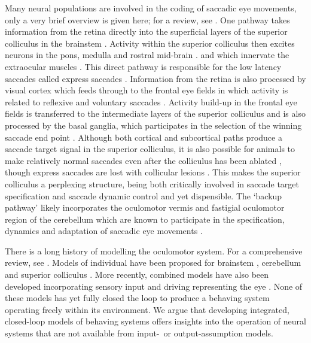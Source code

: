 \documentclass{frontiersSCNS}
\begin{document}
Many neural populations are involved in the coding of saccadic eye
movements, only a very brief overview is given here; for a review,
see \cite{munoz_commentary:_2002}. One pathway takes information from
the retina directly into the superficial layers of the superior
colliculus in the brainstem
\citep{sterling_receptive_1971,linden_massive_1983,wu_involvement_1994}.
Activity within the superior colliculus then excites neurons in the
pons, medulla and rostral mid-brain \citep{sparks_brainstem_2002}.
and  which innervate the extraocular muscles
\citep{fuchs_firing_1970,sparks_brainstem_2002}. This direct pathway
is responsible for the low latency saccades called express saccades
\citep{schiller_effect_1987,edelman_activity_1996}.
%
Information from the retina is also processed by visual cortex which
feeds through to the frontal eye fields in which activity is related
to reflexive and voluntary
saccades \citep{schall_neural_1999}. Activity build-up in the frontal
eye fields is transferred to the intermediate layers of the superior
colliculus
\citep{stanton_frontal_1988-1} and is also processed by the basal ganglia,
which participates in the selection of the winning saccade end point
\citep{stanton_frontal_1988,hikosaka_role_2000}.
%
Although both cortical and subcortical paths produce a saccade target
signal in the superior colliculus, it is also possible for animals to
make relatively normal saccades even after the colliculus has been
ablated
\citep{wurtz_activity_1972,aizawa_reversible_1998},
though express saccades are lost with collicular lesions
\citep{schiller_effect_1987}. This makes the superior colliculus
a perplexing structure, being both critically involved in saccade
target specification \citep{sparks_sensory_1987} and saccade dynamic control
\citep{waitzman_superior_1991,goossens_optimal_2012} and yet dispensible.
The `backup pathway' likely incorporates the oculomotor vermis and
fastigial oculomotor region of the cerebellum which are known to
participate in the specification, dynamics and adaptation of saccadic
eye movements \citep{kleine_saccade-related_2003,takagi_effects_1998}.

There is a long history of modelling the oculomotor system. For a
comprehensive review, see \cite{girard_brainstem_2005}. Models of
individual  have been proposed for brainstem
\citep{robinson_oculomotor_1975,scudder_new_1988,gancarz_neural_1998},
cerebellum \citep{quaia_model_1999,dean_modelling_1995,dean_learning_1994}
and superior colliculus
\citep{arai_two-dimensional_1994,moren_mechanism_2013,marino_spatial_2012}.
More recently, combined models have also been developed incorporating
sensory input \citep{cope_basal_2017} and driving  representing the eye
\citep{tabareau_geometry_2007,nguyen_saccade_2014,thurat_biomimetic_2015}.
None of these models has yet fully closed the loop to produce a
behaving system operating freely within its environment. We argue that
developing integrated, closed-loop models of behaving systems offers
insights into the operation of neural systems that are not available
from input-~or output-assumption models.
\end{document}
